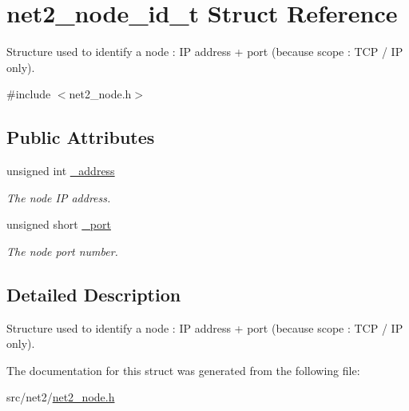 \hypertarget{structnet2__node__id__t}{}\section{net2\+\_\+node\+\_\+id\+\_\+t Struct Reference}
\label{structnet2__node__id__t}


Structure used to identify a node \+: I\+P address + port (because scope \+: T\+C\+P / I\+P only).  




{\ttfamily \#include $<$net2\+\_\+node.\+h$>$}

\subsection*{Public Attributes}
\begin{DoxyCompactItemize}
\item 
\hypertarget{structnet2__node__id__t_a99c44d35c43abc24127fcee951ae1283}{}unsigned int \hyperlink{structnet2__node__id__t_a99c44d35c43abc24127fcee951ae1283}{\+\_\+address}\label{structnet2__node__id__t_a99c44d35c43abc24127fcee951ae1283}

\begin{DoxyCompactList}\small\item\em The node I\+P address. \end{DoxyCompactList}\item 
\hypertarget{structnet2__node__id__t_a3e5d37dee3738ed77b761c86479f5d23}{}unsigned short \hyperlink{structnet2__node__id__t_a3e5d37dee3738ed77b761c86479f5d23}{\+\_\+port}\label{structnet2__node__id__t_a3e5d37dee3738ed77b761c86479f5d23}

\begin{DoxyCompactList}\small\item\em The node port number. \end{DoxyCompactList}\end{DoxyCompactItemize}


\subsection{Detailed Description}
Structure used to identify a node \+: I\+P address + port (because scope \+: T\+C\+P / I\+P only). 

The documentation for this struct was generated from the following file\+:\begin{DoxyCompactItemize}
\item 
src/net2/\hyperlink{net2__node_8h}{net2\+\_\+node.\+h}\end{DoxyCompactItemize}
